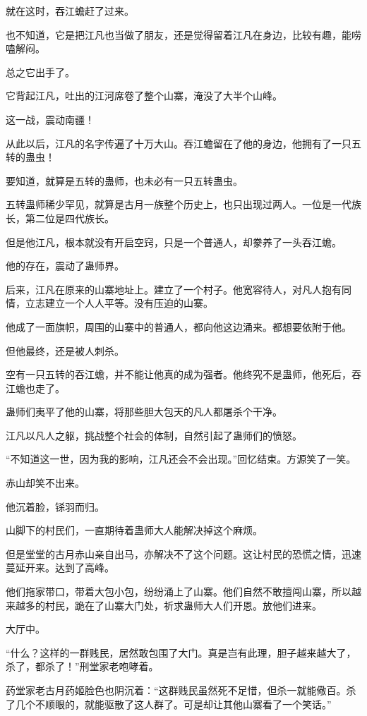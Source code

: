 \begin{this_body}
就在这时，吞江蟾赶了过来。

也不知道，它是把江凡也当做了朋友，还是觉得留着江凡在身边，比较有趣，能唠嗑解闷。

总之它出手了。

它背起江凡，吐出的江河席卷了整个山寨，淹没了大半个山峰。

这一战，震动南疆！

从此以后，江凡的名字传遍了十万大山。吞江蟾留在了他的身边，他拥有了一只五转的蛊虫！

要知道，就算是五转的蛊师，也未必有一只五转蛊虫。

五转蛊师稀少罕见，就算是古月一族整个历史上，也只出现过两人。一位是一代族长，第二位是四代族长。

但是他江凡，根本就没有开启空窍，只是一个普通人，却豢养了一头吞江蟾。

他的存在，震动了蛊师界。

后来，江凡在原来的山寨地址上。建立了一个村子。他宽容待人，对凡人抱有同情，立志建立一个人人平等。没有压迫的山寨。

他成了一面旗帜，周围的山寨中的普通人，都向他这边涌来。都想要依附于他。

但他最终，还是被人刺杀。

空有一只五转的吞江蟾，并不能让他真的成为强者。他终究不是蛊师，他死后，吞江蟾也走了。

蛊师们夷平了他的山寨，将那些胆大包天的凡人都屠杀个干净。

江凡以凡人之躯，挑战整个社会的体制，自然引起了蛊师们的愤怒。

“不知道这一世，因为我的影响，江凡还会不会出现。”回忆结束。方源笑了一笑。

赤山却笑不出来。

他沉着脸，铩羽而归。

山脚下的村民们，一直期待着蛊师大人能解决掉这个麻烦。

但是堂堂的古月赤山亲自出马，亦解决不了这个问题。这让村民的恐慌之情，迅速蔓延开来。达到了高峰。

他们拖家带口，带着大包小包，纷纷涌上了山寨。他们自然不敢擅闯山寨，所以越来越多的村民，跪在了山寨大门处，祈求蛊师大人们开恩。放他们进来。

大厅中。

“什么？这样的一群贱民，居然敢包围了大门。真是岂有此理，胆子越来越大了，杀了，都杀了！”刑堂家老咆哮着。

药堂家老古月药姬脸色也阴沉着：“这群贱民虽然死不足惜，但杀一就能儆百。杀了几个不顺眼的，就能驱散了这人群了。可是却让其他山寨看了一个笑话。”


\end{this_body}
